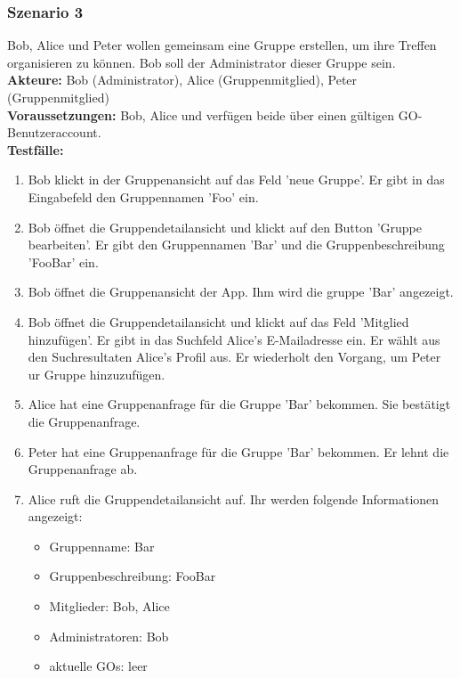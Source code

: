\documentclass[parskip=full]{scrartcl}
\def\threedigits#1{%
  \ifnum#1<100 0\fi
  \ifnum#1<10 0\fi
  \number#1}
\begin{document}
\subsubsection*{Szenario 3} Bob, Alice und Peter wollen gemeinsam eine Gruppe erstellen, um ihre Treffen organisieren zu können. Bob soll der Administrator dieser Gruppe sein.\\

\textbf{Akteure:} Bob (Administrator), Alice (Gruppenmitglied), Peter (Gruppenmitglied) \\

\textbf{Voraussetzungen: }Bob, Alice und verfügen beide über einen gültigen GO-Benutzeraccount.\\

\textbf{Testfälle:}
\begin{enumerate}[label={\textbf{/T\protect\threedigits{\theenumi}0/}}, leftmargin=*, resume]
	\item Bob klickt in der Gruppenansicht auf das Feld 'neue Gruppe'. Er gibt in das Eingabefeld den Gruppennamen 'Foo' ein.
	\item Bob öffnet die Gruppendetailansicht und klickt auf den Button 'Gruppe bearbeiten'. Er gibt den Gruppennamen 'Bar' und die Gruppenbeschreibung 'FooBar' ein.
	\item Bob öffnet die Gruppenansicht der App. Ihm wird die gruppe 'Bar' angezeigt.
	\item Bob öffnet die Gruppendetailansicht und klickt auf das Feld 'Mitglied hinzufügen'. Er gibt in das Suchfeld Alice's E-Mailadresse ein. Er wählt aus den Suchresultaten Alice's Profil aus. Er wiederholt den Vorgang, um Peter ur Gruppe hinzuzufügen.
	\item Alice hat eine Gruppenanfrage für die Gruppe 'Bar' bekommen. Sie bestätigt die Gruppenanfrage.
	\item Peter hat eine Gruppenanfrage für die Gruppe 'Bar' bekommen. Er lehnt die Gruppenanfrage ab.
	\item Alice ruft die Gruppendetailansicht auf. Ihr werden folgende Informationen angezeigt:
	\begin{itemize}
		\item Gruppenname: Bar
		\item Gruppenbeschreibung: FooBar
		\item Mitglieder: Bob, Alice
		\item Administratoren: Bob
		\item aktuelle GOs: leer
	\end{itemize}
\end{enumerate}
\end{document}
